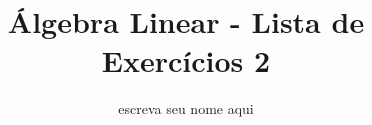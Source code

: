 \documentclass[leqno]{article}
\numberwithin{equation}{section}
\begin{document}
\newtheorem{teo}{Teorema}[section] \newtheorem*{teo*}{Teorema}
\newtheorem{prop}[teo]{Proposição} \newtheorem*{prop*}{Proposição}
\newtheorem{lema}[teo]{Lemma} \newtheorem*{lema*}{Lema}
\newtheorem{cor}[teo]{Corolário} \newtheorem*{cor*}{Corolário}

\theoremstyle{definition}
\newtheorem{defi}[teo]{Definição} \newtheorem*{defi*}{Definição}
\newtheorem{exem}[teo]{Exemplo} \newtheorem*{exem*}{Exemplo}
\newtheorem{obs}[teo]{Observação} \newtheorem*{obs*}{Observação}
\newtheorem*{hipo}{Hipóteses}
\newtheorem*{nota}{Notação}

\newcommand{\ds}{\displaystyle} \newcommand{\nl}{\newline}
\newcommand{\eps}{\varepsilon} \newcommand{\ssty}{\scriptstyle}
\newcommand{\bE}{\mathbb{E}}
\newcommand{\cB}{\mathcal{B}}
\newcommand{\cF}{\mathcal{F}}
\newcommand{\cA}{\mathcal{A}}
\newcommand{\cM}{\mathcal{M}}
\newcommand{\cD}{\mathcal{D}}
\newcommand{\cN}{\mathcal{N}}
\newcommand{\cL}{\mathcal{L}}
\newcommand{\cLN}{\mathcal{LN}}
\newcommand{\bP}{\mathbb{P}}
\newcommand{\bQ}{\mathbb{Q}}
\newcommand{\bN}{\mathbb{N}}
\newcommand{\bR}{\mathbb{R}}
\newcommand{\bZ}{\mathbb{Z}}

\newcommand{\bfw}{\mathbf{w}}
\newcommand{\bfv}{\mathbf{v}}
\newcommand{\bfu}{\mathbf{u}}

\newenvironment{sol}
{
    \vspace{4mm}
    \noindent\textbf{Resolução:}
    \strut\newline
    \smallskip
    \hspace{-3.5mm}
}
{}

\newcommand{\bvecc}[2]{%
  \begin{bmatrix} #1 \\ #2  \end{bmatrix}
}
\newcommand{\bveccc}[3]{%
  \begin{bmatrix} #1 \\ #2 \\ #3  \end{bmatrix}
}


\title{Álgebra Linear - Lista de Exercícios 2}

\author{escreva seu nome aqui}

\date{}

\maketitle
\end{document}
